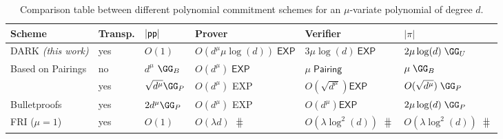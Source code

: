\begin{table}[!htp]
\begin{small}
\begin{tabular}{l||l|l|l|l|l}
	Scheme & Transp. & $|\textsf{pp}|$  & Prover & Verifier & $|\pi|$ \\
	\hline
	\hline
    DARK  \textit{(this work)} & yes & $O(1)$ & $O( d^\mu \mu \log(d) )\; \textsf{EXP}$ & $3\mu \log(d)~\textsf{EXP}$ & $2 \mu \log(d) \; \GG_{U}$ \\
    Based on Pairings & no & $d^\mu$ $\GG_{B}$ & $O(d^\mu)\; \textsf{EXP}$  & $\mu\; \textsf{Pairing} $ & $\mu \; \GG_{B}$\\
    \cite[$\sqrt{\cdot}$]{EC:BCCGP16} & yes & $\sqrt{d^\mu}\GG_{P}$ & $O(d^\mu)$ \textsf{EXP} & $O(\sqrt{d^\mu})\textsf{EXP}$ &$O(\sqrt{d^\mu}) \; \GG_P$\\
       \textsf{Bulletproofs} & yes &$2 d^\mu\GG_{P}$& $O(d^\mu)$ \textsf{EXP}& $O(d^\mu)\textsf{EXP}$ &$2 \mu \log(d) \; \GG_P$\\
       FRI  ($\mu = 1$) & yes & $O(1)$ & $O(\lambda  d)$ $\hash$ & $O(\lambda \log^2(d))$ $\hash$ & $O(\lambda \log^2(d)) \; \hash$
\end{tabular}

\caption{Comparison table between different polynomial commitment schemes for an $\mu$-variate polynomial of degree $d$.}

\label{tab:polycommit}
\end{small}
\end{table}

